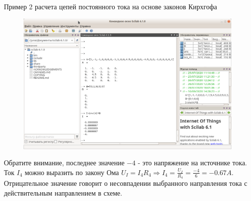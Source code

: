 \documentclass[10pt, pdf, hyperref={unicode},handout]{beamer}
\begin{document}
\begin{frame}{Пример 2  расчета цепей постоянного тока на основе законов Кирхгофа}
  \begin{block}

    \small{

  \begin{figure}[htb] 
    \centering
    \includegraphics [scale=0.6]{ris15.eps}
  \end{figure}
  Обратите внимание, последнее значение $-4$ - это напряжение на источнике тока. Ток $I_4$ можно выразить по закону Ома $U_I=I_4R_4\Rightarrow I_4=\frac{U_I}{R_4}=\frac{-4}{6}=-0.67 A$. Отрицательное значение говорит о несовпадении выбранного направления тока с действительным направлением в схеме.
}
  \end{block}
  
\end{frame}
\end{document}
